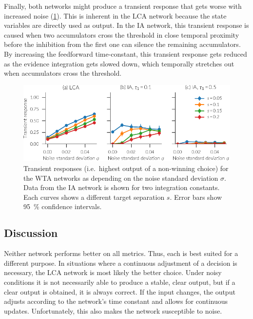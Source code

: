 Finally, both networks might produce a transient response that gets worse with increased noise (\cref{fig:ia-transient}).
This is inherent in the LCA network because the state variables are directly used as output.
In the IA network, this transient response is caused when two accumulators cross the threshold in close temporal proximity before the inhibition from the first one can silence the remaining accumulators.
By increasing the feedforward time-constant, this transient response gets reduced as the evidence integration gets slowed down, which temporally stretches out when accumulators cross the threshold.
\begin{figure}
    \centering
    \includegraphics{figures/ia-transient}
    \caption[Transient WTA responses.]{Transient responses (i.e.\ highest output of a non-winning choice) for the WTA networks as depending on the noise standard deviation $\sigma$. Data from the IA network is shown for two integration constants. Each curves shows a different target separation $s$. Error bars show \SI{95}{\percent} confidence intervals.}\label{fig:ia-transient}
\end{figure}


\subsection{Discussion}
Neither network performs better on all metrics.
Thus, each is best suited for a different purpose.
In situations where a continuous adjustment of a decision is necessary, the LCA network is most likely the better choice.
Under noisy conditions it is not necessarily able to produce a stable, clear output, but if a clear output is obtained, it is always correct.
If the input changes, the output adjusts according to the network's time constant and allows for continuous updates.
Unfortunately, this also makes the network susceptible to noise.

